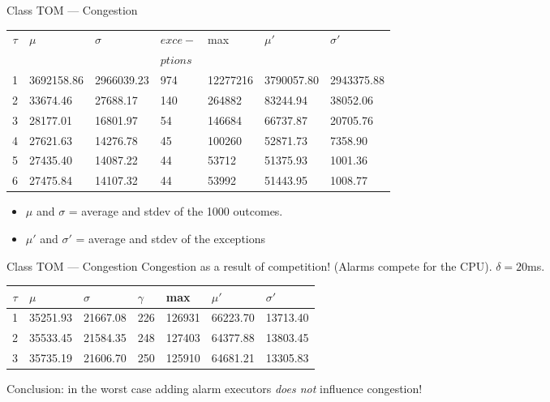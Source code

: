 \begin{frame}[fragile]{Class TOM --- Congestion}


\vspace{20pt}

\noindent
\begin{small}
\begin{tabular}{c|l|l|l|l|l|l}
$\tau$&$\mu$&$\sigma$&$exce-$&max&$\mu'$&$\sigma'$\\
&&&$ptions$&&&\\\hline
1&3692158.86&2966039.23&974&12277216&3790057.80&2943375.88\\
2&33674.46&27688.17&140&264882&83244.94&38052.06\\
3&28177.01&16801.97&54&146684&66737.87&20705.76\\
4&27621.63&14276.78&45&100260&52871.73&7358.90\\
5&27435.40&14087.22&44&53712&51375.93&1001.36\\
6&27475.84&14107.32&44&53992&51443.95&1008.77\\ \hline
\end{tabular}
\end{small}

\begin{itemize}
\item $\mu$ and $\sigma$ = average and stdev of the 1000 outcomes.
\item $\mu'$ and $\sigma'$ = average and stdev of the exceptions
\end{itemize}


\end{frame}
\begin{frame}[fragile]{Class TOM --- Congestion}
\noindent
Congestion as a result of competition! (Alarms compete for the CPU). $\delta=20$ms.


\vspace{20pt}

\begin{tabular}{c|l|l|l|l|l|l}
$\tau$&$\mu$&$\sigma$&$\gamma$&max&$\mu'$&$\sigma'$\\ \hline
1&35251.93&21667.08&226&126931&66223.70&13713.40\\
2&35533.45&21584.35&248&127403&64377.88&13803.45\\ 
3&35735.19&21606.70&250&125910&64681.21&13305.83\\ \hline
\end{tabular}


\vspace{20pt}

Conclusion: in the worst case adding alarm executors \emph{does not\/}
influence congestion!


\end{frame}
